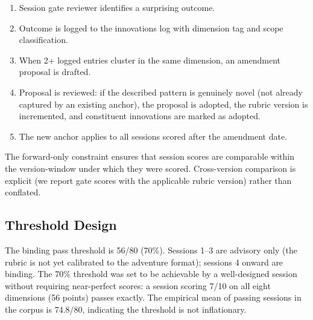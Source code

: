 \begin{enumerate}
  \item Session gate reviewer identifies a surprising outcome.
  \item Outcome is logged to the innovations log with dimension tag and scope classification.
  \item When 2+ logged entries cluster in the same dimension, an amendment proposal is drafted.
  \item Proposal is reviewed: if the described pattern is genuinely novel (not already captured
        by an existing anchor), the proposal is adopted, the rubric version is incremented, and
        constituent innovations are marked as adopted.
  \item The new anchor applies to all sessions scored after the amendment date.
\end{enumerate}

The forward-only constraint ensures that session scores are comparable within the
version-window under which they were scored. Cross-version comparison is explicit
(we report gate scores with the applicable rubric version) rather than conflated.

\subsection{Threshold Design}

The binding pass threshold is 56/80 (70\%). Sessions 1--3 are advisory only (the
rubric is not yet calibrated to the adventure format); sessions 4 onward are binding.
The 70\% threshold was set to be achievable by a well-designed session without requiring
near-perfect scores: a session scoring 7/10 on all eight dimensions (56 points) passes
exactly. The empirical mean of passing sessions in the corpus is 74.8/80, indicating
the threshold is not inflationary.
